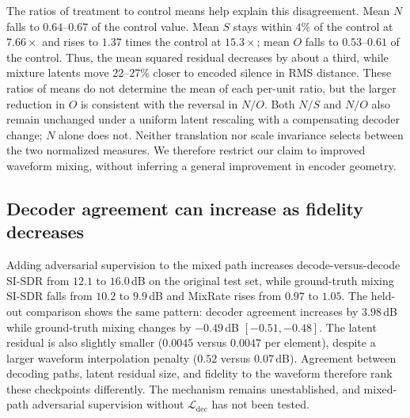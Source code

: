 \documentclass[conference]{IEEEtran}
\newcommand{\Ldec}{\mathcal{L}_\mathrm{dec}}
\begin{document}
\begin{table}[tb]
  \centering\small
  \setlength{\tabcolsep}{3.0pt}
  
  \caption{Held-out latent-error differences. Each recipe is compared with
  its own no-mixing control: the first two columns at $7.66\times$, the
  combined recipe at $15.3\times$. Values are treatment minus control
  ($\times10^{-3}$; negative favours treatment), $\pm$ half the 95\%
  recording-bootstrap interval. $\dagger$ marks the interval containing zero.}
  \label{tab:latnorm}
\end{table}

The ratios of treatment to control means help explain this disagreement.
Mean $N$ falls to $0.64$--$0.67$ of the control value. Mean $S$ stays within
$4\%$ of the control at $7.66\times$ and rises to $1.37$ times the control
at $15.3\times$; mean $O$ falls to $0.53$--$0.61$ of the control. Thus, the
mean squared residual decreases by about a third, while mixture latents move
$22$--$27\%$ closer to encoded silence in RMS distance. These ratios of
means do not determine the mean of each per-unit ratio, but the larger
reduction in $O$ is consistent with the reversal in $N/O$. Both $N/S$ and
$N/O$ also remain unchanged under a uniform latent rescaling with a
compensating decoder change; $N$ alone does not. Neither translation nor
scale invariance selects between the two normalized measures. We therefore
restrict our claim to improved waveform mixing, without inferring a general
improvement in encoder geometry.

\subsection{Decoder agreement can increase as fidelity decreases}\label{sec:consistency}
Adding adversarial supervision to the mixed path increases
decode-versus-decode SI-SDR from $12.1$ to $16.0$\,dB on the original test
set, while ground-truth mixing SI-SDR falls from $10.2$ to $9.9$\,dB and
MixRate rises from $0.97$ to $1.05$. The held-out comparison shows the same
pattern: decoder agreement increases by $3.98$\,dB while ground-truth mixing
changes by $-0.49$\,dB $[-0.51,-0.48]$. The latent residual is also slightly
smaller ($0.0045$ versus $0.0047$ per element), despite a larger waveform
interpolation penalty ($0.52$ versus $0.07$\,dB). Agreement between decoding
paths, latent residual size, and fidelity to the waveform therefore rank
these checkpoints differently. The mechanism remains unestablished, and
mixed-path adversarial supervision without $\Ldec$ has not been tested.
\end{document}

